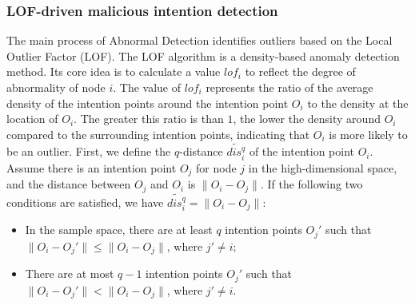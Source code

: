 \documentclass[lettersize,journal]{IEEEtran}
\begin{document}
\subsubsection{LOF-driven malicious intention detection}
The main process of Abnormal Detection identifies outliers based on the Local Outlier Factor (LOF). The LOF algorithm is a density-based anomaly detection method. Its core idea is to calculate a value $lof_i$ to reflect the degree of abnormality of node $i$. The value of $lof_i$ represents the ratio of the average density of the intention points around the intention point $O_i$ to the density at the location of $O_i$. The greater this ratio is than $1$, the lower the density around $O_i$ compared to the surrounding intention points, indicating that $O_i$ is more likely to be an outlier. First, we define the $q$-distance $\widetilde{dis_i^q}$ of the intention point $O_i$. Assume there is an intention point $O_j$ for node $j$ in the high-dimensional space, and the distance between $O_j$ and $O_i$ is $\|O_i-O_j\|$. If the following two conditions are satisfied, we have $\widetilde{dis_i^q} = \|O_i-O_j\|$:


\begin{itemize}
    \item In the sample space, there are at least $q$ intention points $O_j'$ such that $\|O_i-O_j'\| \leq \|O_i-O_j\|$, where $j' \neq i$;
    \item There are at most $q-1$ intention points $O_j'$ such that $\|O_i-O_j'\| < \|O_i-O_j\|$, where $j' \neq i$.
\end{itemize}
\end{document}
